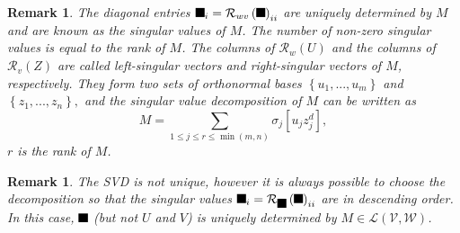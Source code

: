 \documentclass[aps,preprint]{revtex4}%
\providecommand{\U}[1]{\protect\rule{.1in}{.1in}}
\newtheorem{remark}[theorem]{Remark}
\begin{document}
\begin{remark}
The diagonal entries $\U{3c3} _{i}=\mathcal{R}_{wv}\left(  \U{3a3} \right)
_{ii}$ are uniquely determined by $M$ and are known as the singular values of
$M$. The number of non-zero singular values is equal to the rank of $M$. The
columns of $\mathcal{R}_{w}\left(  U\right)  $ and the columns of
$\mathcal{R}_{v}\left(  Z\right)  $ are called \emph{left-singular vectors}
and \emph{right-singular vectors} of $M$, respectively. They form two sets of
orthonormal bases $\left\{  u_{1},...,u_{m}\right\}  $ and $\left\{
z_{1},...,z_{n}\right\}  ,$ and the singular value decomposition of $M$ can be
written as%
\begin{equation}
M=\sum_{1\leq j\leq r\leq\min\left(  m,n\right)  }\sigma_{j}\left[  u_{j}%
z_{j}^{d}\right]  ,
\end{equation}
$r$ is the rank of $M$.
\end{remark}

\begin{remark}
The SVD is not unique, however it is always possible to choose the
decomposition so that the singular values $\U{3c3} _{i}=\mathcal{R}_{\U{3a3}
}\left(  \U{3a3} \right)  _{ii}$ are in descending order. In this case,
$\U{3a3} $ (but not $U$ and $V$) is uniquely determined by $M\in
\mathcal{L}\left(  \mathcal{V},\mathcal{W}\right)  $.
\end{remark}
\end{document}
